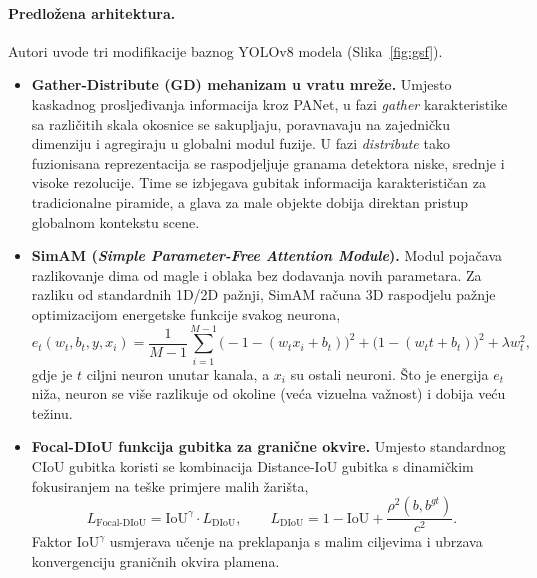 \paragraph{Predložena arhitektura.} Autori uvode tri modifikacije baznog YOLOv8 modela (Slika~\ref{fig:gsf}).
\begin{itemize}
  \item \textbf{Gather-Distribute (GD) mehanizam u vratu mreže.} Umjesto kaskadnog prosljeđivanja informacija kroz PANet, u fazi \emph{gather} karakteristike sa različitih skala okosnice se sakupljaju, poravnavaju na zajedničku dimenziju i agregiraju u globalni modul fuzije. U fazi \emph{distribute} tako fuzionisana reprezentacija se raspodjeljuje granama detektora niske, srednje i visoke rezolucije. Time se izbjegava gubitak informacija karakterističan za tradicionalne piramide, a glava za male objekte dobija direktan pristup globalnom kontekstu scene.
  \item \textbf{SimAM (\emph{Simple Parameter-Free Attention Module}).} Modul pojačava razlikovanje dima od magle i oblaka bez dodavanja novih parametara. Za razliku od standardnih 1D/2D pažnji, SimAM računa 3D raspodjelu pažnje optimizacijom energetske funkcije svakog neurona,
  \begin{equation}
    e_t(w_t, b_t, y, x_i) = \frac{1}{M-1}\sum_{i=1}^{M-1}\bigl(-1-(w_t x_i + b_t)\bigr)^2 + \bigl(1-(w_t t + b_t)\bigr)^2 + \lambda w_t^2,
  \end{equation}
  gdje je $t$ ciljni neuron unutar kanala, a $x_i$ su ostali neuroni. Što je energija $e_t$ niža, neuron se više razlikuje od okoline (veća vizuelna važnost) i dobija veću težinu.
  \item \textbf{Focal-DIoU funkcija gubitka za granične okvire.} Umjesto standardnog CIoU gubitka koristi se kombinacija Distance-IoU gubitka s dinamičkim fokusiranjem na teške primjere malih žarišta,
  \begin{equation}
    L_{\text{Focal-DIoU}} = \mathrm{IoU}^{\gamma}\cdot L_{\mathrm{DIoU}}, \qquad L_{\mathrm{DIoU}} = 1 - \mathrm{IoU} + \frac{\rho^{2}(b, b^{gt})}{c^{2}}.
  \end{equation}
  Faktor $\mathrm{IoU}^{\gamma}$ usmjerava učenje na preklapanja s malim ciljevima i ubrzava konvergenciju graničnih okvira plamena.
\end{itemize}


